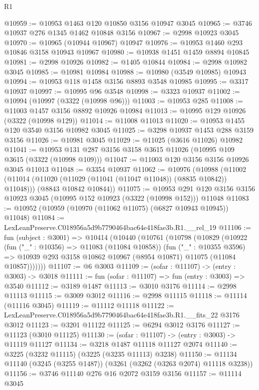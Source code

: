 \begin{lexlean}{R1}
\begin{coremodule}
@10959 := @10953 @1463 @120 @10850 @3156 @10947 @3045
@10965 := @3746 @10937 @276 @1345 @1462 @10848 @3156
@10967 := @2998 @10923 @3045
@10970 := @10965 (@10944 @10967) @10947
@10976 := @10953 @1460 @293 @10846 @3158 @10943 @10967
@10980 := @10938 @1451 @1459 @8894 @10845
@10981 := @2998 @10926
@10982 := @1405 @10844
@10984 := @2998 @10982 @3045
@10985 := @10981 @10984
@10988 := @10980 (@3549 @10985) @10943
@10994 := @10953 @118 @1458 @3156 @8893 @3548 @10985
@10995 := @3317 @10937
@10997 := @10995 @96 @3548
@10998 := @3323 @10937
@11002 := @10994 (@10997 (@3322 (@10998 @96)))
@11003 := @10953 @285
@11008 := @11003 @1457 @3156 @8892 @10926 @10984
@11013 := @10995 @129 @10926 (@3322 (@10998 @129))
@11014 := @11008 @11013
@11020 := @10953 @1455 @120 @3540 @3156 @10982 @3045
@11025 := @3298 @10937 @1453 @288 @3159 @3156
@11026 := @10981 @3045
@11029 := @11025 (@3616 @11026) @10982
@11041 := @10953 @131 @287 @3156 @3158 @3615 @11026 (@10995 @109 @3615 (@3322 (@10998 @109)))
@11047 := @11003 @120 @3156 @3156 @10926 @3045 @11013
@11048 := @3354 @10937
@11062 := @10976
    (@10988
      (@11002 (@11014 (@11020 (@11029 (@11041 (@11047 @11048)) (@8835 @10842)) @11048)))
      (@8843 @10842 @10844))
@11075 := @10953
    @291
    @120
    @3156
    @3156
    @10923
    @3045
    (@10995 @152 @10923 (@3322 (@10998 @152)))
    @11048
@11083 := @10952 (@10959 (@10970 (@11062 @11075) (@6827 @10943 @10945)) @11048)
@11084 := LexLeanPreserve.C018956a5d9b7790464bac64e418fae3b.R1.__rel_19
@11106 := fun (subject : @3001) =>
  @10414
    (@10440
      (@10761
        (@10798
          (@10829
            (@10922
              (fun ("_" : @10356) => @11083 (@11084 @10858))
              (fun ("_" : @10355 @3596) =>
              @10939 @293 @3158 @10862 @10967 (@8954 @10871) @11075 (@11084 @10857)))))))
@11107 := @6 @3003
@11109 := (sofar : @11107) -> (entry : @3003) -> @3018
@11111 := fun (sofar : @11107) => fun (entry : @3003) => @3540
@11112 := @3189 @1487
@11113 := @3010 @3176
@11114 := @2998 @11113
@11115 := @3009 @3012
@11116 := @2998 @11115
@11118 := @11114 (@11116 @3045)
@11119 := @11112 @11118
@11122 := LexLeanPreserve.C018956a5d9b7790464bac64e418fae3b.R1.__fits_22 @3176 @3012
@11123 := @3201 @11122
@11125 := @6294 @3012 @3176
@11127 := @11123 (@3010 @11125)
@11130 := (sofar : @11107) -> (entry : @3003) -> @11119 @11127
@11134 := @3218 @1487 @11118 @11127 @2074
@11140 := @3225 (@3232 @11115) (@3225 (@3235 @11113) @3238)
@11150 := @11134 @11140 (@3245 (@3255 @1487)) (@3261 (@3262 (@3263 @2074) @11118 @3238))
@11156 := @3746 @11140 @276 @16 @2072 @3159 @3156
@11157 := @11114 @3045

\end{coremodule}
\end{lexlean}
